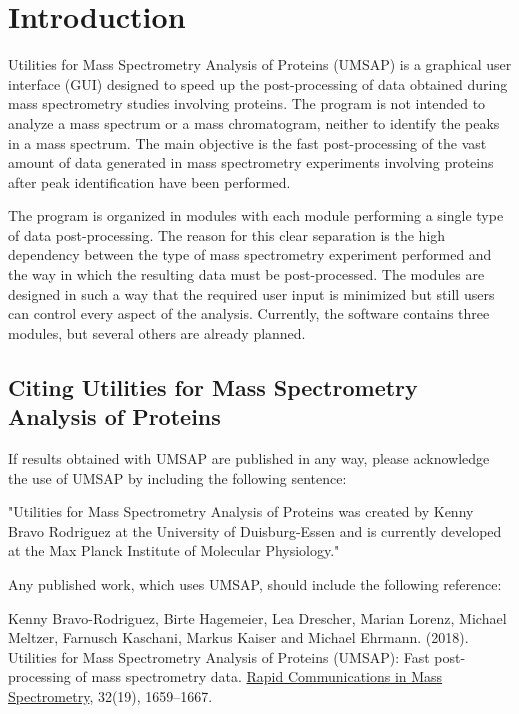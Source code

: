 \chapter{Introduction}

Utilities for Mass Spectrometry Analysis of Proteins (UMSAP) is a graphical user
interface (GUI) designed to speed up the post-processing of data obtained during
mass spectrometry studies involving proteins. The program is not intended to
analyze a mass spectrum or a mass chromatogram, neither to identify the peaks
in a mass spectrum. The main objective is the fast post-processing of the vast
amount of data generated in mass spectrometry experiments involving proteins
after peak identification have been performed.

The program is organized in modules with each module performing a single type
of data post-processing. The reason for this clear separation is the high
dependency between the type of mass spectrometry experiment performed and the
way in which the resulting data must be post-processed. The modules are designed
in such a way that the required user input is minimized but still users can
control every aspect of the analysis. Currently, the software contains three
modules, but several others are already planned.

\section{Citing Utilities for Mass Spectrometry Analysis of Proteins}

If results obtained with UMSAP are published in any way, please acknowledge the
use of UMSAP by including the following sentence:

"Utilities for Mass Spectrometry Analysis of Proteins was created by Kenny Bravo
Rodriguez at the University of Duisburg-Essen and is currently developed at the
Max Planck Institute of Molecular Physiology."

Any published work, which uses UMSAP, should include the following reference:

Kenny Bravo-Rodriguez, Birte Hagemeier, Lea Drescher, Marian Lorenz,
Michael Meltzer, Farnusch Kaschani, Markus Kaiser and Michael Ehrmann.
(\num{2018}). Utilities for Mass Spectrometry Analysis of Proteins (UMSAP): Fast
post-processing of mass spectrometry data.
\href{https://onlinelibrary.wiley.com/doi/10.1002/rcm.8243}{Rapid Communications
in Mass Spectrometry}, \num{32}(\num{19}),
\numrange[range-phrase = --]{1659}{1667}.


